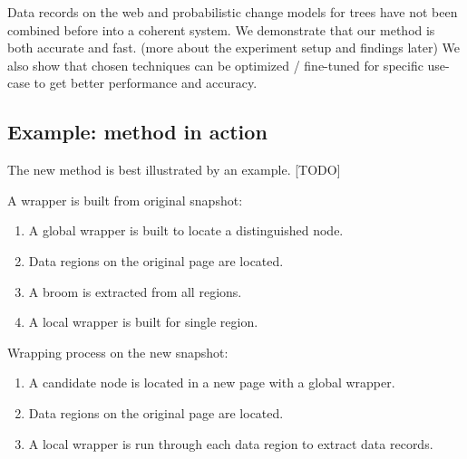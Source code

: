 

Data records on the web and probabilistic change models for trees have not been combined before into a coherent system. We demonstrate that our method is both accurate and fast. (more about the experiment setup and findings later) We also show that chosen techniques can be optimized / fine-tuned for specific use-case to get better performance and accuracy.



\subsection{Example: method in action}

The new method is best illustrated by an example. [TODO]

A wrapper is built from original snapshot:

\begin{enumerate}
	\item A global wrapper is built to locate a distinguished node.
	\item Data regions on the original page are located.
	\item A broom is extracted from all regions.
	\item A local wrapper is built for single region.
\end{enumerate}

Wrapping process on the new snapshot:

\begin{enumerate}
	\item A candidate node is located in a new page with a global wrapper.
	\item Data regions on the original page are located.
	\item A local wrapper is run through each data region to extract data records.
\end{enumerate}




